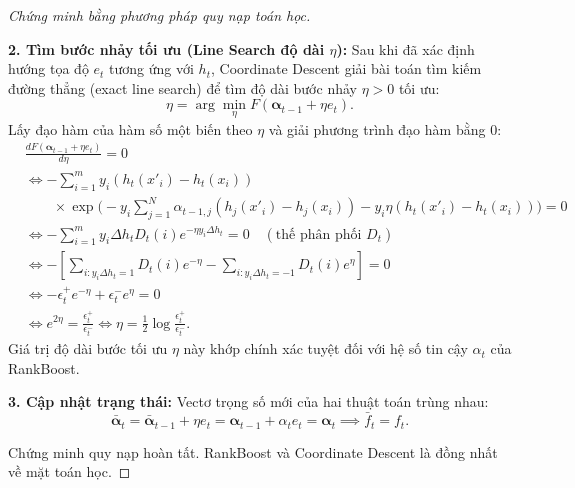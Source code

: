 \begin{proof}[Chứng minh bằng phương pháp quy nạp toán học]
\begin{itemize}
    \textbf{2. Tìm bước nhảy tối ưu (Line Search độ dài $\eta$):}
    Sau khi đã xác định hướng tọa độ $e_t$ tương ứng với $h_t$, Coordinate Descent giải bài toán tìm kiếm đường thẳng (exact line search) để tìm độ dài bước nhảy $\eta > 0$ tối ưu:
    \[
        \eta = \arg\min_{\eta} F(\bm{\alpha}_{t-1} + \eta e_t).
    \]
    Lấy đạo hàm của hàm số một biến theo $\eta$ và giải phương trình đạo hàm bằng $0$:
    \begin{align*}
        &\frac{dF(\bm{\alpha}_{t-1} + \eta e_t)}{d\eta} = 0 \\
        &\iff -\sum_{i=1}^m y_i (h_t(x'_i) - h_t(x_i)) \\
        &\qquad \times \exp\Biggl(-y_i \sum_{j=1}^N \alpha_{t-1,j} (h_j(x'_i) - h_j(x_i)) - y_i \eta (h_t(x'_i) - h_t(x_i)) \Biggr) = 0 \\
        &\iff -\sum_{i=1}^m y_i \Delta h_t D_t(i) e^{-\eta y_i \Delta h_t} = 0 \quad (\text{thế phân phối } D_t) \\
        &\iff -\left[ \sum_{i: y_i \Delta h_t = 1} D_t(i) e^{-\eta} - \sum_{i: y_i \Delta h_t = -1} D_t(i) e^{\eta} \right] = 0 \\
        &\iff -\epsilon^+_t e^{-\eta} + \epsilon^-_t e^{\eta} = 0 \\
        &\iff e^{2\eta} = \frac{\epsilon^+_t}{\epsilon^-_t} \iff \eta = \frac{1}{2}\log\frac{\epsilon^+_t}{\epsilon^-_t}.
    \end{align*}
    Giá trị độ dài bước tối ưu $\eta$ này khớp chính xác tuyệt đối với hệ số tin cậy $\alpha_t$ của RankBoost.
    
    \textbf{3. Cập nhật trạng thái:}
    Vectơ trọng số mới của hai thuật toán trùng nhau:
    \[
        \bar{\bm{\alpha}}_t = \bar{\bm{\alpha}}_{t-1} + \eta e_t = \bm{\alpha}_{t-1} + \alpha_t e_t = \bm{\alpha}_t \implies \bar{f}_t = f_t.
    \]
\end{itemize}
Chứng minh quy nạp hoàn tất. RankBoost và Coordinate Descent là đồng nhất về mặt toán học.
\end{proof}

